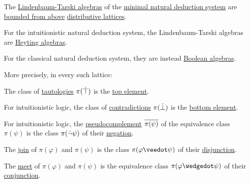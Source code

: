 \begin{proposition}\label{thm:lindenbaum_tarski_algebras}
  The \hyperref[def:lindenbaum_tarski_algebra]{Lindenbaum-Tarski algebras} of the \hyperref[def:propositional_natural_deduction_systems]{minimal natural deduction system} are \hyperref[def:extremal_points/bounds]{bounded from above} \hyperref[def:distributive_lattice]{distributive lattices}.

  \begin{thmenum}[series=thm:lindenbaum_tarski_algebras]
     For the intuitionistic natural deduction system, the Lindenbaum-Tarski algebras are \hyperref[def:heyting_algebra]{Heyting algebras}.

     For the classical natural deduction system, they are instead \hyperref[def:boolean_algebra]{Boolean algebras}.
  \end{thmenum}

  More precisely, in every such lattice:
  \begin{thmenum}[resume=thm:lindenbaum_tarski_algebras]
     The class of \hyperref[def:propositional_tautology]{tautologies} \( \pi(\dot{\top}) \) is the \hyperref[def:extremal_points/top_and_bottom]{top element}.

     For intuitionistic logic, the class of \hyperref[def:propositional_contradiction]{contradictions} \( \pi(\dot{\bot}) \) is the \hyperref[def:extremal_points/top_and_bottom]{bottom element}.

     For intuitionistic logic, the \hyperref[eq:def:heyting_algebra/pseudocomplement]{pseudocomplement} \( \oline{\pi(\psi)} \) of the equivalence class \( \pi(\psi) \) is the class \( \pi(\dot{\neg} \psi) \) of their \hyperref[def:propositional_alphabet/negation]{negation}.

     The \hyperref[def:lattice/join]{join} of \( \pi(\varphi) \) and \( \pi(\psi) \) is the class \( \pi(\varphi \synvee \psi) \) of their \hyperref[def:propositional_alphabet/connectives/disjunction]{disjunction}.

     The \hyperref[def:lattice/meet]{meet} of \( \pi(\varphi) \) and \( \pi(\psi) \) is the equivalence class \( \pi(\varphi \synwedge \psi) \) of their \hyperref[def:propositional_alphabet/connectives/conjunction]{conjunction}.


\end{thmenum}
\end{proposition}
